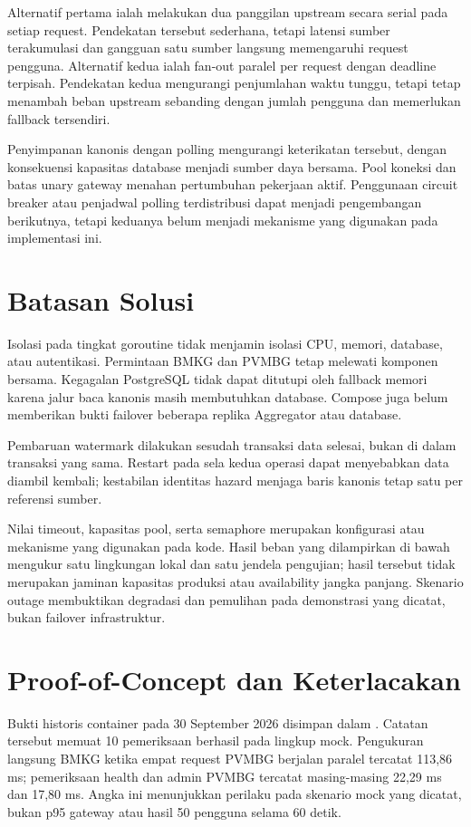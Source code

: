 Alternatif pertama ialah melakukan dua panggilan upstream secara serial pada
setiap request. Pendekatan tersebut sederhana, tetapi latensi sumber terakumulasi
dan gangguan satu sumber langsung memengaruhi request pengguna. Alternatif kedua
ialah fan-out paralel per request dengan deadline terpisah. Pendekatan kedua
mengurangi penjumlahan waktu tunggu, tetapi tetap menambah beban upstream
sebanding dengan jumlah pengguna dan memerlukan fallback tersendiri.

Penyimpanan kanonis dengan polling mengurangi keterikatan tersebut, dengan
konsekuensi kapasitas database menjadi sumber daya bersama. Pool koneksi dan
batas unary gateway menahan pertumbuhan pekerjaan aktif. Penggunaan circuit
breaker atau penjadwal polling terdistribusi dapat menjadi pengembangan
berikutnya, tetapi keduanya belum menjadi mekanisme yang digunakan pada
implementasi ini.

\section{Batasan Solusi}

Isolasi pada tingkat goroutine tidak menjamin isolasi CPU, memori, database,
atau autentikasi. Permintaan BMKG dan PVMBG tetap melewati komponen bersama.
Kegagalan PostgreSQL tidak dapat ditutupi oleh fallback memori karena jalur
baca kanonis masih membutuhkan database. Compose juga belum memberikan bukti
failover beberapa replika Aggregator atau database.

Pembaruan watermark dilakukan sesudah transaksi data selesai, bukan di dalam
transaksi yang sama. Restart pada sela kedua operasi dapat menyebabkan data
diambil kembali; kestabilan identitas hazard menjaga baris kanonis tetap satu
per referensi sumber.

Nilai timeout, kapasitas pool, serta semaphore merupakan konfigurasi atau
mekanisme yang digunakan pada kode. Hasil beban yang dilampirkan di bawah
mengukur satu lingkungan lokal dan satu jendela pengujian; hasil tersebut
tidak merupakan jaminan kapasitas produksi atau availability jangka panjang.
Skenario outage membuktikan degradasi dan pemulihan pada demonstrasi yang
dicatat, bukan failover infrastruktur.

\section{Proof-of-Concept dan Keterlacakan}

Bukti historis container pada 30 September 2026 disimpan dalam
. Catatan tersebut memuat
10 pemeriksaan berhasil pada lingkup mock. Pengukuran langsung BMKG ketika
empat request PVMBG berjalan paralel tercatat 113,86 ms; pemeriksaan health dan
admin PVMBG tercatat masing-masing 22,29 ms dan 17,80 ms. Angka ini menunjukkan
perilaku pada skenario mock yang dicatat, bukan p95 gateway atau hasil
50 pengguna selama 60 detik.

